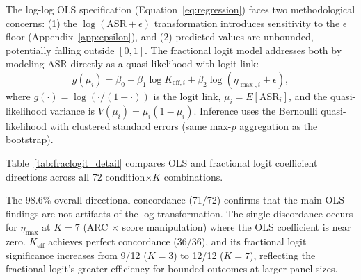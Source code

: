 The log-log OLS specification (Equation~\ref{eq:regression}) faces two methodological concerns: (1) the $\log(\mathrm{ASR} + \epsilon)$ transformation introduces sensitivity to the $\epsilon$ floor (Appendix~\ref{app:epsilon}), and (2) predicted values are unbounded, potentially falling outside $[0, 1]$. The fractional logit model \citep{papke1996econometric} addresses both by modeling ASR directly as a quasi-likelihood with logit link:
\begin{equation}
g(\mu_i) = \beta_0 + \beta_1 \log K_{\mathrm{eff},i} + \beta_2 \log(\eta_{\max,i} + \epsilon),
\end{equation}
where $g(\cdot) = \log(\cdot/(1-\cdot))$ is the logit link, $\mu_i = E[\mathrm{ASR}_i]$, and the quasi-likelihood variance is $V(\mu_i) = \mu_i(1-\mu_i)$. Inference uses the Bernoulli quasi-likelihood with clustered standard errors (same max-$p$ aggregation as the bootstrap).

Table~\ref{tab:fraclogit_detail} compares OLS and fractional logit coefficient directions across all 72 condition$\times K$ combinations.

\begin{table}[h]
\centering
\caption{Fractional logit vs.\ OLS comparison across $K$ values. Concordance: fraction of conditions where the coefficient direction (positive/negative) matches between OLS and fractional logit. $K_{\mathrm{eff}}$ direction is perfectly concordant (36/36); $\eta_{\max}$ shows 1 discordance (at $K{=}7$ where the coefficient is near zero). Fractional logit significance is computed with clustered SE (max-$p$, BH FDR $\alpha{=}0.05$).}
\label{tab:fraclogit_detail}
\small
{}
\end{table}

The 98.6\% overall directional concordance (71/72) confirms that the main OLS findings are not artifacts of the log transformation. The single discordance occurs for $\eta_{\max}$ at $K{=}7$ (ARC $\times$ score manipulation) where the OLS coefficient is near zero. $K_{\mathrm{eff}}$ achieves perfect concordance (36/36), and its fractional logit significance increases from 9/12 ($K{=}3$) to 12/12 ($K{=}7$), reflecting the fractional logit's greater efficiency for bounded outcomes at larger panel sizes.

